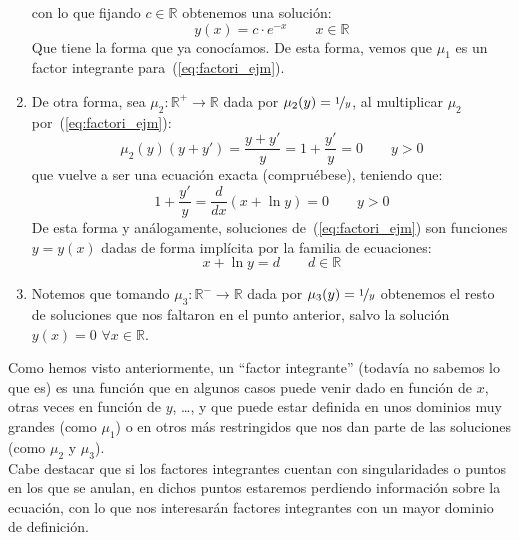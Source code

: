 \begin{ejemplo}
\begin{enumerate}
            con lo que fijando $c\in \mathbb{R}$ obtenemos una solución:
            \begin{equation*}
                y(x) = c\cdot e^{-x} \qquad x\in \mathbb{R}
            \end{equation*}
            Que tiene la forma que ya conocíamos. De esta forma, vemos que $\mu_1$ es un factor integrante para~(\ref{eq:factori_ejm}).
        \item De otra forma, sea $\mu_2:\mathbb{R}^+\rightarrow\mathbb{R}$ dada por $\mu_2(y) = \nicefrac{1}{y}$, al multiplicar $\mu_2$ por~(\ref{eq:factori_ejm}):
            \begin{equation*}
                \mu_2(y)(y+y') = \dfrac{y+y'}{y} = 1 + \dfrac{y'}{y} = 0 \qquad y>0
            \end{equation*}
            que vuelve a ser una ecuación exacta (compruébese), teniendo que:
            \begin{equation*}
                1 + \dfrac{y'}{y} = \dfrac{d}{dx}(x+\ln y) = 0 \qquad y>0
            \end{equation*}
            De esta forma y análogamente, soluciones de~(\ref{eq:factori_ejm}) son funciones $y=y(x)$ dadas de forma implícita por la familia de ecuaciones:
            \begin{equation*}
                x + \ln y = d \qquad d\in \mathbb{R}
            \end{equation*}
        \item Notemos que tomando $\mu_3:\mathbb{R}^-\rightarrow\mathbb{R}$ dada por $\mu_3(y) = \nicefrac{1}{y}$ obtenemos el resto de soluciones que nos faltaron en el punto anterior, salvo la solución $y(x) = 0$ $\forall x\in \mathbb{R}$.
    \end{enumerate}
\end{ejemplo}

Como hemos visto anteriormente, un ``factor integrante'' (todavía no sabemos lo que es) es una función que en algunos casos puede venir dado en función de $x$, otras veces en función de $y$, \ldots, y que puede estar definida en unos dominios muy grandes (como $\mu_1$) o en otros más restringidos que nos dan parte de las soluciones (como $\mu_2$ y $\mu_3$).\\

Cabe destacar que si los factores integrantes cuentan con singularidades o puntos en los que se anulan, en dichos puntos estaremos perdiendo información sobre la ecuación, con lo que nos interesarán factores integrantes con un mayor dominio de definición.

